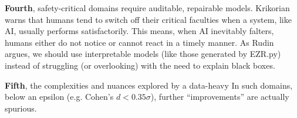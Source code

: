 {\bf Fourth}, safety-critical domains require auditable, repairable models. 
Krikorian~\cite{krikorian2026tesla} warns  that   humans
tend  to switch off their critical
faculties when a system, like AI, usually performs satisfactorily. This means,  when AI inevitably falters, humans either do not notice or cannot react in a timely manner.
As Rudin \cite{rudin2019stop} argues, we should use interpretable models (like those generated by EZR.py) instead of struggling (or overlooking) with the need  to explain black boxes.


{\bf Fifth}, the complexities and nuances explored by a data-heavy
 In such domains, below an epsilon (e.g. Cohen's \mbox{$d < 0.35\sigma$}), further “improvements” are actually spurious. 


